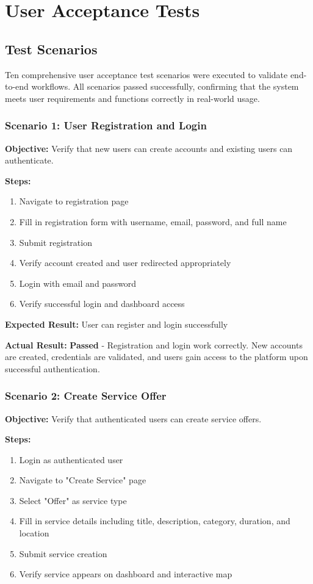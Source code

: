 \documentclass[12pt,a4paper]{report}
\begin{document}
\section{User Acceptance Tests}

\subsection{Test Scenarios}

Ten comprehensive user acceptance test scenarios were executed to validate end-to-end workflows. All scenarios passed successfully, confirming that the system meets user requirements and functions correctly in real-world usage.

\subsubsection{Scenario 1: User Registration and Login}

\textbf{Objective:} Verify that new users can create accounts and existing users can authenticate.

\textbf{Steps:}
\begin{enumerate}
    \item Navigate to registration page
    \item Fill in registration form with username, email, password, and full name
    \item Submit registration
    \item Verify account created and user redirected appropriately
    \item Login with email and password
    \item Verify successful login and dashboard access
\end{enumerate}

\textbf{Expected Result:} User can register and login successfully

\textbf{Actual Result:} \textbf{Passed} - Registration and login work correctly. New accounts are created, credentials are validated, and users gain access to the platform upon successful authentication.

\subsubsection{Scenario 2: Create Service Offer}

\textbf{Objective:} Verify that authenticated users can create service offers.

\textbf{Steps:}
\begin{enumerate}
    \item Login as authenticated user
    \item Navigate to "Create Service" page
    \item Select "Offer" as service type
    \item Fill in service details including title, description, category, duration, and location
    \item Submit service creation
    \item Verify service appears on dashboard and interactive map
\end{enumerate}
\end{document}
